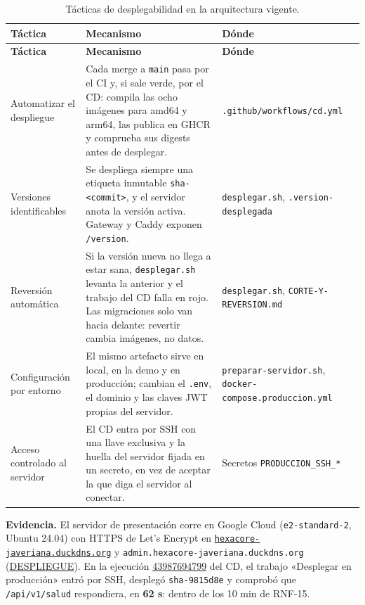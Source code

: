 \begin{center}
\begin{longtable}{|>{\raggedright\arraybackslash}p{2.8cm}|>{\raggedright\arraybackslash}p{6.7cm}|>{\raggedright\arraybackslash}p{3.8cm}|}
\caption{Tácticas de desplegabilidad en la arquitectura vigente.}\label{tab:desplegabilidad-vigente}\\
\hline
\textbf{Táctica} & \textbf{Mecanismo} & \textbf{Dónde}\\
\hline
\endfirsthead
\hline
\textbf{Táctica} & \textbf{Mecanismo} & \textbf{Dónde}\\
\hline
\endhead
Automatizar el despliegue &
Cada merge a \texttt{main} pasa por el CI y, si sale verde, por el CD: compila las ocho imágenes
para amd64 y arm64, las publica en GHCR y comprueba sus digests antes de desplegar. &
\texttt{.github/\allowbreak workflows/\allowbreak cd.yml}\\
\hline
Versiones identificables &
Se despliega siempre una etiqueta inmutable \texttt{sha-<commit>}, y el servidor anota la versión
activa. Gateway y Caddy exponen \texttt{/version}. &
\texttt{desplegar.sh}, \texttt{.version-\allowbreak desplegada}\\
\hline
Reversión automática &
Si la versión nueva no llega a estar sana, \texttt{desplegar.sh} levanta la anterior y el trabajo
del CD falla en rojo. Las migraciones solo van hacia delante: revertir cambia imágenes, no datos. &
\texttt{desplegar.sh}, \texttt{CORTE-Y-\allowbreak REVERSION.md}\\
\hline
Configuración por entorno &
El mismo artefacto sirve en local, en la demo y en producción; cambian el \texttt{.env}, el dominio
y las claves JWT propias del servidor. &
\texttt{preparar-\allowbreak servidor.sh}, \texttt{docker-compose.\allowbreak produccion.yml}\\
\hline
Acceso controlado al servidor &
El CD entra por SSH con una llave exclusiva y la huella del servidor fijada en un secreto, en vez
de aceptar la que diga el servidor al conectar. &
Secretos \texttt{PRODUCCION\_SSH\_*}\\
\hline
\end{longtable}
\end{center}

\begin{sloppypar}\noindent\textbf{Evidencia.} El servidor de presentación corre en Google Cloud (\texttt{e2-standard-2},
Ubuntu 24.04) con HTTPS de Let's Encrypt en
\href{https://hexacore-javeriana.duckdns.org}{\texttt{hexacore-\allowbreak javeriana.\allowbreak duckdns.org}} y
\texttt{admin.\allowbreak hexacore-\allowbreak javeriana.\allowbreak duckdns.org}
(\href{https://github.com/Emperador24/HEXACORE/blob/main/App/infra/DESPLIEGUE.md}{DESPLIEGUE}). En
la ejecución
\href{https://github.com/Emperador24/HEXACORE/actions/runs/43987694799}{43987694799} del CD, el
trabajo «Desplegar en producción» entró por SSH, desplegó \texttt{sha-9815d8e} y comprobó que
\texttt{/api/v1/salud} respondiera, en \textbf{62 s}: dentro de los 10 min de RNF-15.\end{sloppypar}

